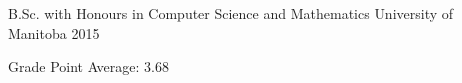 \begin{cventries}
  \cventry
    {B.Sc. with Honours in Computer Science and Mathematics}
    {University of Manitoba}
    {\winnipeg}
    {2015}
    {
      \begin{cvitems}
        \item {Grade Point Average: 3.68}
      \end{cvitems}
    }
\end{cventries}
